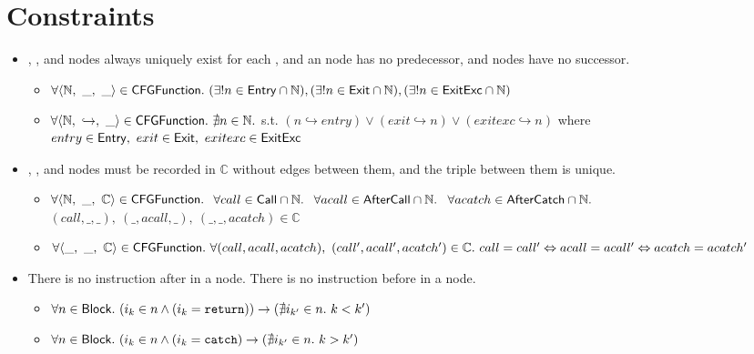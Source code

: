 \section{Constraints}
\begin{itemize}
\item {}, , and  nodes always uniquely exist for each ,
and an  node has no predecessor,  and  nodes have no successor.
\begin{itemize}
\item $\forall \langle \mathbb{N},\ \_,\ \_ \rangle \in \mbox{\textsf{CFGFunction}}.\ (\exists! n \in \mbox{\textsf{Entry}} \cap \mathbb{N}), (\exists! n \in \mbox{\textsf{Exit}} \cap \mathbb{N}), (\exists! n \in \mbox{\textsf{ExitExc}} \cap \mathbb{N})$
\item $\forall \langle \mathbb{N},\ \hookrightarrow,\ \_ \rangle \in \SF{CFGFunction}.\ \nexists n \in \mathbb{N}.$
s.t. $(n \hookrightarrow entry) \vee (exit \hookrightarrow n) \vee (exitexc \hookrightarrow n)$
where $entry \in \mbox{\textsf{Entry}},\ exit \in \mbox{\textsf{Exit}},\ exitexc \in \mbox{\textsf{ExitExc}}$
\end{itemize}

\item {}, , and  nodes must be recorded in $\mathbb{C}$ without edges between them, and the triple between them is unique.
\begin{itemize}
\item $\forall \langle \mathbb{N},\ \_,\ \mathbb{C} \rangle \in \SF{CFGFunction}.\ $
$\forall call \in \SF{Call} \cap \mathbb{N}.\ $
$\forall acall \in \mbox{\textsf{AfterCall}} \cap \mathbb{N}.\ $
$\forall acatch \in \mbox{\textsf{AfterCatch}} \cap \mathbb{N}.\ $
$(call, \_, \_),\ (\_, acall, \_),\ (\_, \_, acatch) \in \mathbb{C}$
\item $\forall \langle \_,\ \_,\ \mathbb{C} \rangle \in \mbox{\textsf{CFGFunction}}.\ \forall (call, acall, acatch),\ (call', acall', acatch') \in \mathbb{C}.\ call = call' \Leftrightarrow acall = acall' \Leftrightarrow acatch = acatch'$
\end{itemize}

\item There is no instruction after  in a node. There is no instruction before  in a node.
\begin{itemize}
\item $\forall n \in \mbox{\textsf{Block}}.\ (i_k \in n \wedge (i_k = \mbox{\texttt{return}})) \rightarrow (\nexists i_{k'} \in n.\ k < k')$
\item $\forall n \in \mbox{\textsf{Block}}.\ (i_k \in n \wedge (i_k = \mbox{\texttt{catch}}) \rightarrow (\nexists i_{k'} \in n.\ k > k')$
\end{itemize}

\end{itemize}

